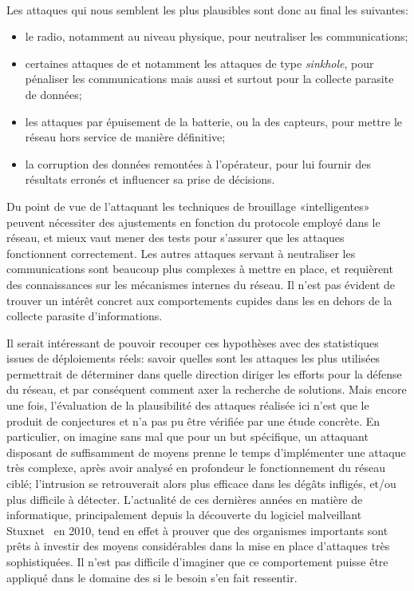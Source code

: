         \paragraph{}
Les attaques qui nous semblent les plus plausibles sont donc au final les suivantes:
\begin{itemize}
    \item le  radio, notamment au niveau physique, pour neutraliser les communications;
    \item certaines attaques de  et notamment les attaques de type \textit{sinkhole}, pour pénaliser les communications mais aussi et surtout pour la collecte parasite de données;
    \item les attaques par épuisement de la batterie, ou la  des capteurs, pour mettre le réseau hors service de manière définitive;
    \item la corruption des données remontées à l'opérateur, pour lui fournir des résultats erronés et influencer sa prise de décisions.
\end{itemize}

Du point de vue de l'attaquant les techniques de brouillage «intelligentes» peu\-vent nécessiter des ajustements en fonction du protocole \mac employé dans le réseau, et mieux vaut mener des tests pour s'assurer que les attaques fonctionnent correctement.
Les autres attaques servant à neutraliser les communications sont beaucoup plus complexes à mettre en place, et requièrent des connaissances sur les mécanismes internes du réseau.
Il n'est pas évident de trouver un intérêt concret aux comportements cupides dans les \rcs en dehors de la collecte parasite d'informations.

Il serait intéressant de pouvoir recouper ces hypothèses avec des statistiques issues de déploiements réels: savoir quelles sont les attaques les plus utilisées permettrait de déterminer dans quelle direction diriger les efforts pour la défense du réseau, et par conséquent comment axer la recherche de solutions.
Mais encore une fois, l'évaluation de la plausibilité des attaques réalisée ici n'est que le produit de conjectures et n'a pas pu être vérifiée par une étude concrète.
En particulier, on imagine sans mal que pour un but spécifique, un attaquant disposant de suffisamment de moyens prenne le temps d'implémenter une attaque très complexe, après avoir analysé en profondeur le fonctionnement du réseau ciblé; l'intrusion se retrouverait alors plus efficace dans les dégâts infligés, et/ou plus difficile à détecter.
L'actualité de ces dernières années en matière de \secu informatique, principalement depuis la découverte du logiciel malveillant Stuxnet~\cite{stuxnet} en 2010, tend en effet à prouver que des organismes importants sont prêts à investir des moyens considérables dans la mise en place d'attaques très sophistiquées.
Il n'est pas difficile d'imaginer que ce comportement puisse être appliqué dans le domaine des \rcs si le besoin s'en fait ressentir.
